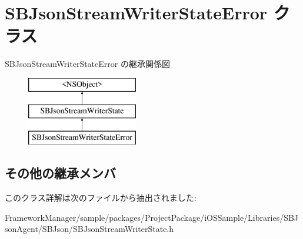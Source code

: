 \hypertarget{interface_s_b_json_stream_writer_state_error}{}\section{S\+B\+Json\+Stream\+Writer\+State\+Error クラス}
\label{interface_s_b_json_stream_writer_state_error}
S\+B\+Json\+Stream\+Writer\+State\+Error の継承関係図\begin{figure}[H]
\begin{center}
\leavevmode
\includegraphics[height=3.000000cm]{interface_s_b_json_stream_writer_state_error}
\end{center}
\end{figure}
\subsection*{その他の継承メンバ}


このクラス詳解は次のファイルから抽出されました\+:\begin{DoxyCompactItemize}
\item 
Framework\+Manager/sample/packages/\+Project\+Package/i\+O\+S\+Sample/\+Libraries/\+S\+B\+Json\+Agent/\+S\+B\+Json/S\+B\+Json\+Stream\+Writer\+State.\+h\end{DoxyCompactItemize}
